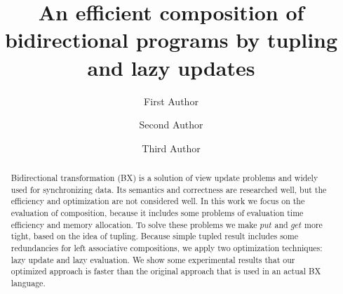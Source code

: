 \documentclass[runningheads]{llncs}
\begin{document}
%
\title{An efficient composition of bidirectional programs
  by tupling and lazy updates 
}
%
%
\author{First Author \and
Second Author \and
Third Author}
%
%
%
\maketitle              %
%
\begin{abstract}
  Bidirectional transformation (BX) is a solution of view update problems and widely used for synchronizing data. Its semantics and correctness are researched well, but the efficiency and optimization are not considered well. In this work we focus on the evaluation of composition, because it includes some problems of evaluation time efficiency and memory allocation. To solve these problems we make $put$ and $get$ more tight, based on the idea of tupling. %
  Because simple tupled result includes some redundancies for left associative compositions, we apply two optimization techniques: lazy update and lazy evaluation. We show some experimental results that our optimized approach is faster than the original approach that is used in an actual BX language.

  
\end{abstract}
%
%
%

\end{document}
